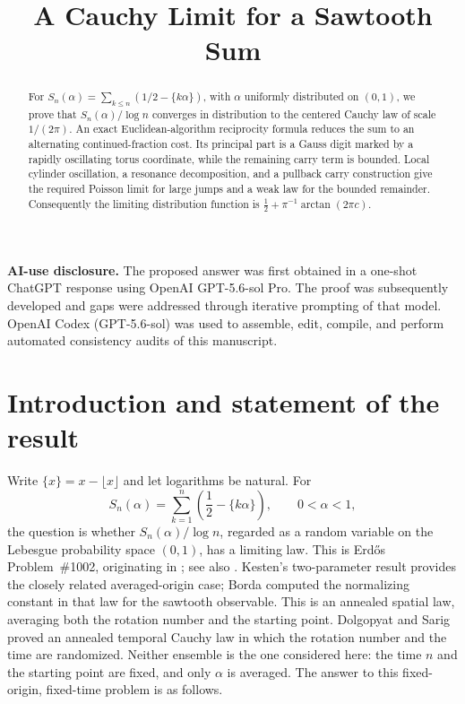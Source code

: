 \documentclass[11pt,a4paper]{amsart}
\title{A Cauchy Limit for a Sawtooth Sum}
\date{}
\theoremstyle{definition}
\theoremstyle{remark}
\begin{document}
\begin{abstract}
For $S_n(\alpha)=\sum_{k\le n}(1/2-\{k\alpha\})$, with $\alpha$ uniformly distributed on $(0,1)$, we prove that $S_n(\alpha)/\log n$ converges in distribution to the centered Cauchy law of scale $1/(2\pi)$.  An exact Euclidean-algorithm reciprocity formula reduces the sum to an alternating continued-fraction cost.  Its principal part is a Gauss digit marked by a rapidly oscillating torus coordinate, while the remaining carry term is bounded.  Local cylinder oscillation, a resonance decomposition, and a pullback carry construction give the required Poisson limit for large jumps and a weak law for the bounded remainder.  Consequently the limiting distribution function is $\frac12+\pi^{-1}\arctan(2\pi c)$.
\end{abstract}

\maketitle

\begin{center}
\textbf{AI-use disclosure.} The proposed answer was first obtained in a
one-shot ChatGPT response using OpenAI GPT-5.6-sol Pro.  The proof was
subsequently developed and gaps were addressed through iterative prompting of
that model.
OpenAI Codex (GPT-5.6-sol) was used to assemble, edit, compile, and perform
automated consistency audits of this manuscript.
\end{center}

\section{Introduction and statement of the result}

Write $\{x\}=x-\lfloor x\rfloor$ and let logarithms be natural.  For
\[
 S_n(\alpha)=\sum_{k=1}^{n}\left(\frac12-\{k\alpha\}\right),
 \qquad 0<\alpha<1,
\]
the question is whether $S_n(\alpha)/\log n$, regarded as a random variable on
the Lebesgue probability space $(0,1)$, has a limiting law.  This is
Erd\H{o}s Problem~\#1002, originating in \cite{Er64b}; see also
\cite{Bloom1002}.  Kesten's two-parameter result \cite{Ke60} provides the
closely related averaged-origin case; Borda \cite{Borda25} computed the
normalizing constant in that law for the sawtooth observable.  This is an
annealed spatial law, averaging both the rotation number and the starting
point.  Dolgopyat and Sarig \cite{DS20} proved an annealed temporal Cauchy
law in which the rotation number and the time are randomized.  Neither
ensemble is the one considered here: the time $n$ and the starting point are
fixed, and only $\alpha$ is averaged.  The answer to this fixed-origin,
fixed-time problem is as follows.
\end{document}
